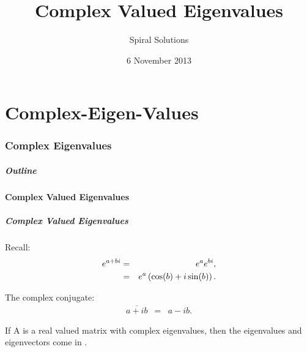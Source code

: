 \part{Complex-Eigen-Values}
\section{Complex Eigenvalues}


\title{Complex Valued Eigenvalues}
\subtitle{Spiral Solutions}
\date{6 November 2013}

\begin{frame}
  \titlepage
\end{frame}

\begin{frame}
  \frametitle{Outline}
  \tableofcontents[currentsection]
\end{frame}


\subsection{Complex Valued Eigenvalues}


\begin{frame}
  \frametitle{Complex Valued Eigenvalues}

  Recall:
  \begin{eqnarray*}
    e^{a+bi} & = & e^a e^{bi}, \\
    & = & e^a \left( \cos(b) + i \sin(b) \right).
  \end{eqnarray*}

  \vfill

  The complex conjugate:
  \begin{eqnarray*}
    \overline{a+ib} & = & a-i b.
  \end{eqnarray*}

  \vfill

  If A is a real valued matrix with complex eigenvalues, then
  the eigenvalues and eigenvectors come in .

\end{frame}

